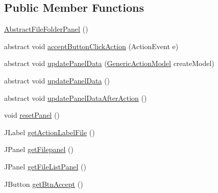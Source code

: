 \subsection*{Public Member Functions}
\begin{DoxyCompactItemize}
\item 
\hyperlink{classcom_1_1poly_1_1nlp_1_1filekommander_1_1views_1_1panels_1_1_abstract_file_folder_panel_aa6c3bb2b8c0c7e0a03d3869041136a36}{Abstract\-File\-Folder\-Panel} ()
\item 
abstract void \hyperlink{classcom_1_1poly_1_1nlp_1_1filekommander_1_1views_1_1panels_1_1_abstract_file_folder_panel_a26a9ad5640e6599d1df64ebf9b04041d}{accept\-Button\-Click\-Action} (Action\-Event e)
\item 
abstract void \hyperlink{classcom_1_1poly_1_1nlp_1_1filekommander_1_1views_1_1panels_1_1_abstract_file_folder_panel_a0c413991b7c48758fec4d52d592065fb}{update\-Panel\-Data} (\hyperlink{interfacecom_1_1poly_1_1nlp_1_1filekommander_1_1views_1_1models_1_1_generic_action_model}{Generic\-Action\-Model} create\-Model)
\item 
abstract void \hyperlink{classcom_1_1poly_1_1nlp_1_1filekommander_1_1views_1_1panels_1_1_abstract_file_folder_panel_acdf1d105f87dc13772870234aea299d4}{update\-Panel\-Data} ()
\item 
abstract void \hyperlink{classcom_1_1poly_1_1nlp_1_1filekommander_1_1views_1_1panels_1_1_abstract_file_folder_panel_a2308ee0dc3eaea5b8b525fd02f60e000}{update\-Panel\-Data\-After\-Action} ()
\item 
void \hyperlink{classcom_1_1poly_1_1nlp_1_1filekommander_1_1views_1_1panels_1_1_abstract_file_folder_panel_addfb93f97c8eee6dd6131042c13d680b}{reset\-Panel} ()
\item 
J\-Label \hyperlink{classcom_1_1poly_1_1nlp_1_1filekommander_1_1views_1_1panels_1_1_abstract_file_folder_panel_a5604a494d100a6d78750a985cfe0b340}{get\-Action\-Label\-File} ()
\item 
J\-Panel \hyperlink{classcom_1_1poly_1_1nlp_1_1filekommander_1_1views_1_1panels_1_1_abstract_file_folder_panel_ab551ed106b53e4bfaddc438b918be406}{get\-Filepanel} ()
\item 
J\-Panel \hyperlink{classcom_1_1poly_1_1nlp_1_1filekommander_1_1views_1_1panels_1_1_abstract_file_folder_panel_a65b9fd5b80a3d0d19afa10cfbfa3304e}{get\-File\-List\-Panel} ()
\item 
J\-Button \hyperlink{classcom_1_1poly_1_1nlp_1_1filekommander_1_1views_1_1panels_1_1_abstract_file_folder_panel_a4fc9eabf9e39bb20440c92c83837b8fb}{get\-Btn\-Accept} ()

\end{DoxyCompactItemize}
